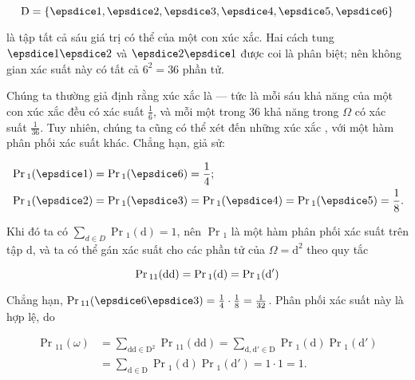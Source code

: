 \begin{equation*}
    \mathrm{D} = \{ \vcdice{1}, \vcdice{2}, \vcdice{3}, \vcdice{4}, \vcdice{5}, \vcdice{6} \}
\end{equation*}

là tập tất cả sáu giá trị có thể của một con xúc xắc.
Hai cách tung $\vcdice{1} \vcdice{2}$ và $\vcdice{2} \vcdice{1}$ được coi là phân biệt; nên không gian xác suất này có tất cả $6^2 = 36$ phần tử.

Chúng ta thường giả định rằng xúc xắc là  --- tức là mỗi sáu khả năng của một con xúc xắc đều có xác suất $\frac{1}{6}$, và mỗi một trong $36$ khả năng trong $\Omega$ có xác suất $\frac{1}{36}$.
Tuy nhiên, chúng ta cũng có thể xét đến những xúc xắc , với một hàm phân phối xác suất khác.
Chẳng hạn, giả sử:

\begin{equation*}
    \begin{aligned}
        & \Pr\mathrm{}_1( \vcdice{1} ) = \Pr\mathrm{}_1( \vcdice{6} ) = \frac{1}{4}; \\
        & \Pr\mathrm{}_1( \vcdice{2} ) = \Pr\mathrm{}_1( \vcdice{3} ) = \Pr\mathrm{}_1( \vcdice{4} ) = \Pr\mathrm{}_1( \vcdice{5} ) = \frac{1}{8}.
    \end{aligned}
\end{equation*}

Khi đó ta có $\sum_{d \in D} \Pr\mathrm{}_1(\mathrm{d}) = 1$, nên $\Pr\mathrm{}_1$ là một hàm phân phối xác suất trên tập $\mathrm{d}$, và ta có thể gán xác suất cho các phần tử của $\Omega = \mathrm{d}^2$ theo quy tắc

\begin{equation}\label{eq:8.2}
    \Pr\mathrm{}_{11}( \mathrm{d} \mathrm{d} ) = \Pr\mathrm{}_1( \mathrm{d} ) = \Pr\mathrm{}_1( \mathrm{d'} ) \\
\end{equation}

Chẳng hạn, $\Pr\mathrm{}_{11}( \vcdice{6} \vcdice{3} ) = \frac{1}{4} \cdot \frac{1}{8} = \frac{1}{32}$.
Phân phối xác suất này là hợp lệ, do

\begin{equation*}
    \begin{aligned}
        \Pr\mathrm{}_{11}( \omega ) & = \sum_{\mathrm{d} \mathrm{d} \in \mathrm{D}^2} \Pr\mathrm{}_{11}( \mathrm{d} \mathrm{d} ) = \sum_{\mathrm{d}, \mathrm{d'} \in \mathrm{D}} \Pr\mathrm{}_1( \mathrm{d} ) \Pr\mathrm{}_1( \mathrm{d'} ) \\
        & = \sum_{\mathrm{d} \in \mathrm{D}} \Pr\mathrm{}_1( \mathrm{d} ) \Pr\mathrm{}_1( \mathrm{d'} ) = 1 \cdot 1 = 1.
    \end{aligned}
\end{equation*}

